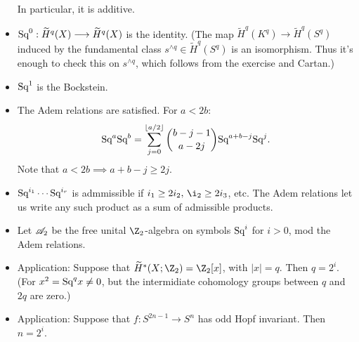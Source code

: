 \documentclass[11pt]{article}
\begin{document}
\begin{SteenrodTalk}
\begin{itemize}
In particular, it is additive.
\item 
$\textup{Sq}^0: \widetilde H^q (X) \longrightarrow \widetilde H^q (X)$ is the identity. (The map $\widetilde H^q(K^q)\to\widetilde H^q(S^q)$ induced by the fundamental class $s^{\wedge q}\in\widetilde H^q(S^q)$ is an isomorphism. Thus it's enough to check this on $s^{\wedge q}$, which follows from the exercise and Cartan.)
\item
$\textup{Sq}^1$ is the Bockstein.
\item The Adem relations are satisfied. For $a<2b$: 
\[
\textup{Sq}^a \textup{Sq}^b = \sum_{j=0}^{\lfloor a/2\rfloor} \binom{b-j-1}{a-2j} \textup{Sq}^{a+b-j} \textup{Sq}^j.
\]
Note that $a<2b\implies a+b-j\geq2j$.
\item $\textup{Sq}^{i_1}\cdots\textup{Sq}^{i_r}$ is admmissible if $i_1\geq 2i_2,\,\i_2\geq 2i_3$, etc. The Adem relations let us write any such product as a sum of admissible products.
\item Let $\mathscr{A}_2$ be the free unital $\Z_2$-algebra on symbols $\textup{Sq}^i$ for $i>0$, mod the Adem relations.
\item Application: Suppose that $\widetilde H^*(X;\Z_2)=\Z_2[x]$, with $|x|=q$. Then $q=2^i$. (For $x^2=\textup{Sq}^{q}x\neq0$, but the intermidiate cohomology groups between $q$ and $2q$ are zero.)
\item Application: Suppose that $f:S^{2n-1}\to S^n$ has odd Hopf invariant. Then $n=2^i$.
\end{itemize}

\pagebreak
\end{SteenrodTalk}
\end{document}
